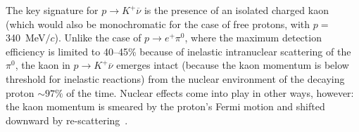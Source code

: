
The key signature for $p\to K^+\overline{\nu}$ is the presence of an
isolated charged kaon (which would also be monochromatic 
for the case of free protons, with $p=$\SI{340}{\MeV}$/c$).  
Unlike the case of $p\to e^+\pi^0$, where the maximum
detection efficiency is limited to 40--45\% because of inelastic
intranuclear scattering of the $\pi^0$, the kaon in $p\to
K^+\overline{\nu}$ emerges intact (because the kaon momentum is 
below threshold for inelastic reactions)
from the nuclear environment of the decaying proton $\sim 97\%$ of the
time.  Nuclear effects come into play in other ways, however: the kaon
momentum is smeared by the proton's Fermi motion and shifted downward
by re-scattering~\cite{Stefan:2008zi}. 


